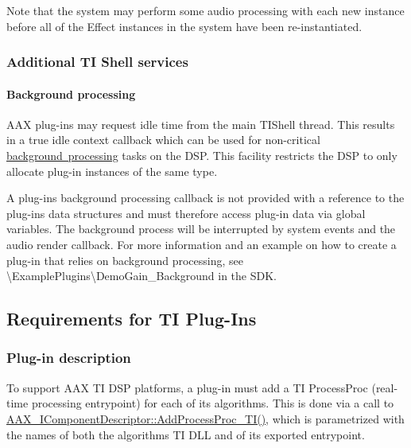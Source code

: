 Note that the system may perform some audio processing with each new instance before all of the Effect instances in the system have been re-\/instantiated.

\hypertarget{a00832_subsection__additional_ti_shell_services}{}\subsubsection{Additional T\+I Shell services}\label{a00832_subsection__additional_ti_shell_services}


\hypertarget{a00832_subsubsection__background_processing_}{}\paragraph{Background processing}\label{a00832_subsubsection__background_processing_}
 A\+AX plug-\/ins may request idle time from the main T\+I\+Shell thread. This results in a true idle context callback which can be used for non-\/critical \mbox{\hyperlink{a00811}{background processing}} tasks on the D\+SP. This facility restricts the D\+SP to only allocate plug-\/in instances of the same type.

A plug-\/in\textquotesingle{}s background processing callback is not provided with a reference to the plug-\/in\textquotesingle{}s data structures and must therefore access plug-\/in data via global variables. The background process will be interrupted by system events and the audio render callback. For more information and an example on how to create a plug-\/in that relies on background processing, see {\ttfamily \textbackslash{}Example\+Plugins\textbackslash{}Demo\+Gain\+\_\+\+Background} in the S\+DK. 

 \hypertarget{a00832_aax_ti_guide_03_requirements_for_ti_plug_ins}{}\subsection{Requirements for T\+I Plug-\/\+Ins}\label{a00832_aax_ti_guide_03_requirements_for_ti_plug_ins}
\hypertarget{a00832_subsection__plugin_description}{}\subsubsection{Plug-\/in description}\label{a00832_subsection__plugin_description}
To support A\+AX TI D\+SP platforms, a plug-\/in must add a TI Process\+Proc (real-\/time processing entrypoint) for each of its algorithms. This is done via a call to \mbox{\hyperlink{a01781_a38f7fb30a378a17ce9635f5c36100a3b}{A\+A\+X\+\_\+\+I\+Component\+Descriptor\+::\+Add\+Process\+Proc\+\_\+\+T\+I()}}, which is parametrized with the names of both the algorithm\textquotesingle{}s TI D\+LL and of its exported entrypoint.

